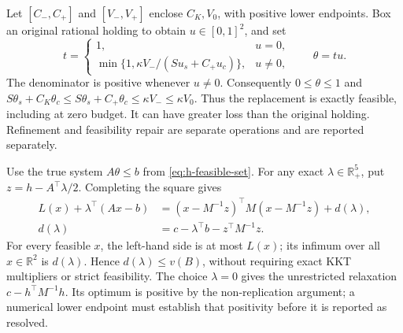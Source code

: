 \documentclass[11pt]{article}
\begin{document}
Let $[C_-,C_+]$ and $[V_-,V_+]$ enclose $C_K,V_0$, with positive
lower endpoints. Box an original rational holding to obtain
$u\in[0,1]^2$, and set
\begin{equation}
 t=\begin{cases}1,&u=0,\\
 \min\{1,\kappa V_-/(Su_s+C_+u_c)\},&u\ne0,
 \end{cases}
 \qquad \theta=tu.
 \label{eq:h-outward-feasibility}
\end{equation}
The denominator is positive whenever $u\ne0$. Consequently
$0\leq\theta\leq1$ and
$S\theta_s+C_K\theta_c\leq S\theta_s+C_+\theta_c
\leq\kappa V_-\leq\kappa V_0$.
Thus the replacement is exactly feasible, including at zero budget.
It can have greater loss than the original holding. Refinement and
feasibility repair are separate operations and are reported separately.

Use the true system $A\theta\leq b$ from
\eqref{eq:h-feasible-set}. For any exact $\lambda\in\mathbb R^5_+$, put
$z=h-A^\top\lambda/2$. Completing the square gives
\begin{equation}
 \begin{aligned}
 L(x)+\lambda^\top(Ax-b)
 &=(x-M^{-1}z)^\top M(x-M^{-1}z)+d(\lambda),\\
 d(\lambda)&=c-\lambda^\top b-z^\top M^{-1}z.
 \end{aligned}
 \label{eq:h-certified-dual}
\end{equation}
For every feasible $x$, the left-hand side is at most $L(x)$;
its infimum over all $x\in\mathbb R^2$ is $d(\lambda)$.
Hence $d(\lambda)\leq v(B)$, without requiring exact KKT multipliers
or strict feasibility. The choice $\lambda=0$ gives the unrestricted
relaxation $c-h^\top M^{-1}h$. Its optimum is positive by the
non-replication argument; a numerical lower endpoint must establish that
positivity before it is reported as resolved.
\end{document}
